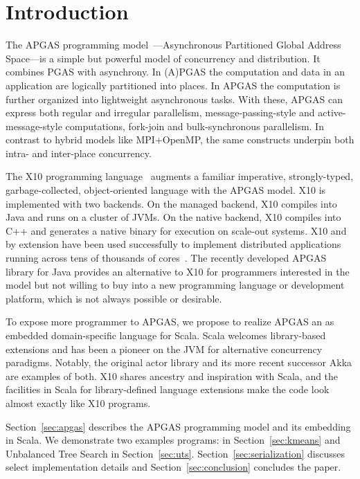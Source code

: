 \section{Introduction}

The APGAS programming model~\cite{amp10}---Asynchronous Partitioned Global Address Space---is a simple but powerful
model of concurrency and distribution. It combines PGAS with asynchrony.
In (A)PGAS the computation and data in an application are logically partitioned into places.
In APGAS the computation is further organized into lightweight asynchronous tasks.
With these, APGAS can express both
regular and irregular parallelism, message-passing-style and
active-message-style computations, fork-join and bulk-synchronous
parallelism.  In contrast to hybrid models like MPI+OpenMP, the same
constructs underpin both intra- and inter-place concurrency.

The X10 programming language~\cite{oopsla05} augments a familiar imperative, strongly-typed, garbage-collected, object-oriented language with the APGAS model. X10 is implemented with two backends. On the managed backend, X10
compiles into Java and runs on a cluster of JVMs. On the native backend, X10 compiles into C++ and generates a native binary
for execution on scale-out systems.
X10 and by extension
\apgas have been used successfully to implement distributed applications
running across tens of thousands of cores~\cite{TardieuETAL14X10ApgasAtPetascale}.
The recently developed APGAS library for Java \cite{APGASJava} provides an alternative to X10 for programmers interested in the \apgas model but not willing to buy into a new programming language or development platform, which is not always possible or desirable.

To expose more programmer to APGAS, we propose to realize APGAS an as embedded domain-specific language for Scala. 
Scala welcomes library-based extensions and has been a pioneer on
the JVM for alternative concurrency paradigms. Notably, the original actor
library and its more recent successor Akka are examples of both. 
X10 shares ancestry and inspiration with Scala, and the
facilities in Scala for library-defined language extensions make the code look
almost exactly like X10 programs.

Section~\ref{sec:apgas} describes the APGAS programming model and its embedding in Scala. We demonstrate two examples programs: \kmeans in Section~\ref{sec:kmeans} and Unbalanced Tree Search in Section~\ref{sec:uts}. Section~\ref{sec:serialization} discusses select implementation details and Section~\ref{sec:conclusion} concludes the paper.

